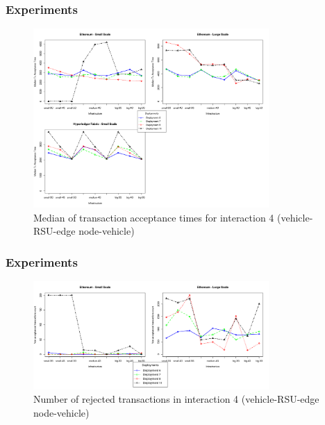 \documentclass{beamer}
\begin{document}
	\begin{frame}
		\frametitle{Experiments}
		
		\begin{figure}
			\centering
			\includegraphics[width=0.8\textwidth]{figures/interaction4_median_accept_time.png}
			\vspace{-0.5cm}
			\caption{Median of transaction acceptance times for interaction 4 (vehicle-\gls{RSU}-edge node-vehicle)}
			\label{fig:experiments5}
		\end{figure}
		
	\end{frame}


	\begin{frame}
		\frametitle{Experiments}
		
		\begin{figure}
			\centering
			\includegraphics[width=0.8\textwidth]{figures/interaction4_rejected_tx.png}
			\vspace{-0.5cm}
			\caption{Number of rejected transactions in interaction 4 (vehicle-\gls{RSU}-edge node-vehicle)}
			\label{fig:experiments6}
		\end{figure}
	
	\end{frame}
\end{document}
